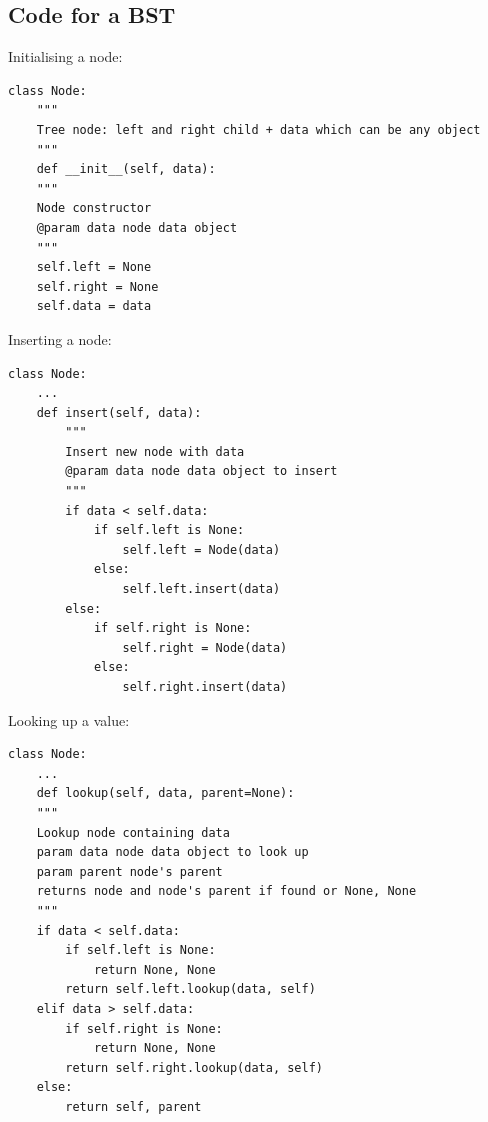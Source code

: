 \documentclass{article}[18pt]
\begin{document}
\subsection{Code for a BST}
Initialising a node:
\begin{lstlisting}
class Node:
	"""
	Tree node: left and right child + data which can be any object
	"""
	def __init__(self, data):
	"""
	Node constructor
	@param data node data object
	"""
	self.left = None
	self.right = None
	self.data = data
\end{lstlisting}
Inserting a node:
\begin{lstlisting}[tabsize=4]
class Node:
	...
	def insert(self, data):
		"""
		Insert new node with data
		@param data node data object to insert
		"""
		if data < self.data:
			if self.left is None:
				self.left = Node(data)
			else:
				self.left.insert(data)
		else:
			if self.right is None:
				self.right = Node(data)
			else:
				self.right.insert(data)
\end{lstlisting}
Looking up a value:
\begin{lstlisting}
class Node:
	...
	def lookup(self, data, parent=None):
	"""
	Lookup node containing data
	param data node data object to look up
	param parent node's parent
	returns node and node's parent if found or None, None
	"""
	if data < self.data:
		if self.left is None:
			return None, None
		return self.left.lookup(data, self)
	elif data > self.data:
		if self.right is None:
			return None, None
		return self.right.lookup(data, self)
	else:
		return self, parent
\end{lstlisting}
\end{document}
